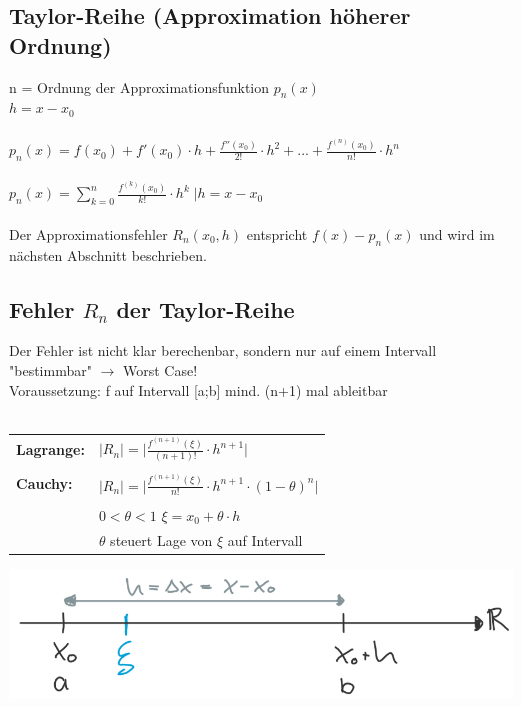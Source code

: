 			\subsection{Taylor-Reihe (Approximation höherer Ordnung)}
			n = Ordnung der Approximationsfunktion $p_n(x)$ \\
			$h = x - x_0$ \\
			\\
			$p_n(x) = f(x_0) + f'(x_0) \cdot h + \frac{f''(x_0)}{2!} \cdot h^2 + ... + \frac{f^{(n)}(x_0)}{n!} \cdot h^n$	 \\
			\\
			$p_n(x) = \sum\limits_{k=0}^{n} \frac{f^{(k)}(x_0)}{k!} \cdot h^k \; \vert h = x-x_0$\\
			\\
			Der Approximationsfehler $R_n (x_0, h)$ entspricht $f(x) - p_n(x)$ und wird im nächsten Abschnitt beschrieben.		
			
			
			\subsection{Fehler $R_n$ der Taylor-Reihe}
			Der Fehler ist nicht klar berechenbar, sondern nur auf einem Intervall "bestimmbar" $\rightarrow$ Worst Case! \\			
			Voraussetzung: f auf Intervall [a;b] mind. (n+1) mal ableitbar\\
			\\
			\begin{tabular}{ll}
			\textbf{Lagrange:} &  $\vert R_n \vert = \vert \frac{f^{(n+1)}(\xi)}{(n+1)!} \cdot h^{n+1} \vert $ \\
			\\
			\textbf{Cauchy:} & $\vert R_n \vert = \vert \frac{f^{(n+1)} (\xi)}{n!}  \cdot h^{n+1} \cdot (1 - \theta)^n \vert$ \\
			\\
			& $0 < \theta < 1$    $\xi = x_0 + \theta \cdot h$ \\
			& $\theta$ steuert Lage von $\xi$ auf Intervall \\
			\end{tabular}
			
		\includegraphics[width=0.7\linewidth]{Bilder/zahlenstrahl}
			
